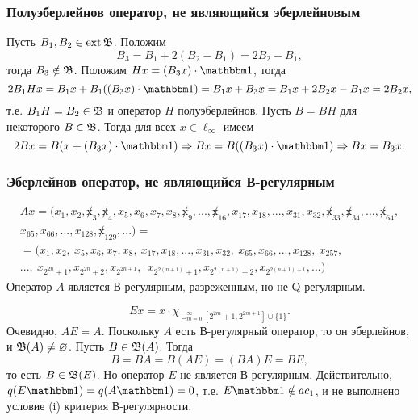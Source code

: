 \begin{frame}\frametitle{{Полуэберлейнов оператор, не являющийся эберлейновым}}
	Пусть $B_1, B_2 \in \operatorname{ext} \mathfrak{B}$.
	Положим
	\begin{equation}
		\label{eq:am_not_eber_def}
		B_3 = B_1 + 2(B_2-B_1) = 2B_2-B_1,
	\end{equation}
	тогда $B_3 \notin \mathfrak{B}$.
	Положим $Hx = (B_3 x) \cdot\one$, тогда
	\begin{equation}
		2 B_1 H x = B_1 x + B_1 ((B_3 x) \cdot\one) = B_1 x + B_3 x =
		B_1 x + 2 B_2 x - B_1 x = 2B_2 x
		,
	\end{equation}
	т.е. $B_1 H = B_2 \in \mathfrak{B}$ и оператор $H$ полуэберлейнов.
	Пусть $B = BH$ для некоторого $B\in\mathfrak{B}$.
	Тогда для всех $x\in\ell_\infty$ имеем
	\begin{equation}
		2Bx = B (x + (B_3 x) \cdot \one)
		\Rightarrow
		Bx =  B((B_3 x) \cdot \one)
		\Rightarrow
		Bx = B_3x
		.
	\end{equation}
\end{frame}

\begin{frame}\frametitle{{Эберлейнов оператор, не являющийся В-регулярным}}
	\vspace{-3em}
	\begin{multline}
		\label{eq:oper_A_throws_out_2power_blocks}
		Ax = (x_1, x_2, \not x_3, \not x_4, x_5, x_6, x_7, x_8, \not x_9, ..., \not x_{16}, x_{17}, x_{18}, ..., x_{31}, x_{32}, \not x_{33}, \not x_{34}, ..., \not x_{64},
		\\
		x_{65}, x_{66}, ..., x_{128}, \not x_{129}, ...)=
		\\=
		(x_1, x_2, \ x_5, x_6, x_7, x_8, \ x_{17}, x_{18}, ..., x_{31}, x_{32}, \ x_{65}, x_{66}, ..., x_{128}, \ x_{257},
		\\
		..., \ x_{2^{2n} +1}, x_{2^{2n} +2},  x_{2^{2n+1}}, \ \ x_{2^{2(n+1)} +1},  x_{2^{2(n+1)} +2},  x_{2^{2(n+1)+1}}, ...)
	\end{multline}
	Оператор $A$ является В-регулярным, разреженным, но не Q-регулярным.
	\vfill

	\begin{equation}
		Ex = x \cdot \chi_{\cup_{m=0}^{\infty}\left[2^{2 m}+1, 2^{2 m+1}\right] \cup\{1\}}
		.
	\end{equation}
	\vfill
	Очевидно, $AE=A$.
	Поскольку $A$ есть В-регулярный оператор, то он эберлейнов,
	и $\mathfrak{B}(A)\ne\varnothing$.
	Пусть $B\in\mathfrak{B}(A)$. Тогда
	\begin{equation}
		B = BA = B(AE) = (BA)E = BE
		,
	\end{equation}
	то есть $B\in\mathfrak{B}(E)$.
	Но оператор $E$ не является В-регулярным.
	Действительно, $q(E\one) =q(A\one) =0$, т.е. $ E\one \notin ac_1$,
	и не выполнено условие (i) критерия В-регулярности.
	\vfill
\end{frame}


